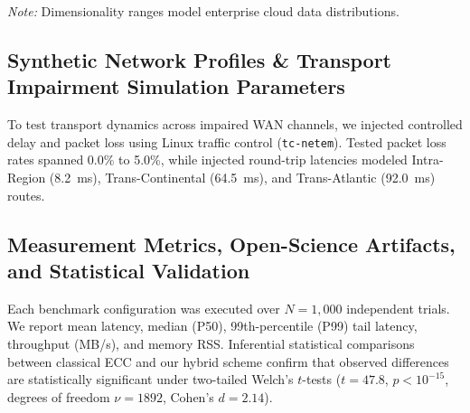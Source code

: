 \documentclass[sn-mathphys,Numbered]{sn-jnl}%
\theoremstyle{thmstyleone}%
\theoremstyle{thmstyletwo}%
\theoremstyle{thmstylethree}%
\begin{document}
\begin{table}[!htbp]
\centering
\caption{Synthetic workload characteristics and dimensionality profiles.}
\label{tab:workload_profiles}
\vspace{0.3em}
\raggedright\small\textit{Note:} Dimensionality ranges model enterprise cloud data distributions.
\end{table}

\subsection{\textbf{Synthetic Network Profiles \& Transport Impairment Simulation Parameters}}
To test transport dynamics across impaired WAN channels, we injected controlled delay and packet loss using Linux traffic control (\texttt{tc-netem}). Tested packet loss rates spanned 0.0\% to 5.0\%, while injected round-trip latencies modeled Intra-Region (8.2~ms), Trans-Continental (64.5~ms), and Trans-Atlantic (92.0~ms) routes.

\subsection{\textbf{Measurement Metrics, Open-Science Artifacts, and Statistical Validation}}
Each benchmark configuration was executed over $N = 1{,}000$ independent trials. We report mean latency, median (P50), 99th-percentile (P99) tail latency, throughput (MB/s), and memory RSS. Inferential statistical comparisons between classical ECC and our hybrid scheme confirm that observed differences are statistically significant under two-tailed Welch's $t$-tests ($t = 47.8$, $p < 10^{-15}$, degrees of freedom $\nu = 1892$, Cohen's $d = 2.14$).
\end{document}
